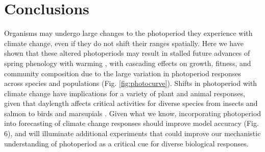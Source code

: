 \documentclass{article}
\begin{document}
\section*{Conclusions}
Organisms may undergo large changes to the photoperiod they experience with climate change, even if they do not shift their ranges spatially. Here we have shown that these altered photoperiods may result in stalled future advances of spring phenology with warming \cite[e.g., Table S1, Fig. \ref{fig:fagus},][]{fu2019, gusewell2017,yu2010}, with cascading effects on growth, fitness, and community composition due to the large variation in photoperiod responses across species and populations (Fig. \ref{fig:photocurve}). Shifts in photoperiod with climate change have implications for a variety of plant and animal responses, given that daylength affects critical activities for diverse species from insects \citep{bradshaw2006,linn1996} and salmon \citep{taranger2003,solbakken1994} to birds \citep{dawson2001} and marsupials \citep{mcallan2006,solbakken1994}. Given what we know, incorporating photoperiod into forecasting of climate change responses should improve model accuracy (Fig. 6), and will illuminate additional experiments that could improve our mechanistic understanding of photoperiod as a critical cue for diverse biological responses. 
\end{document}
